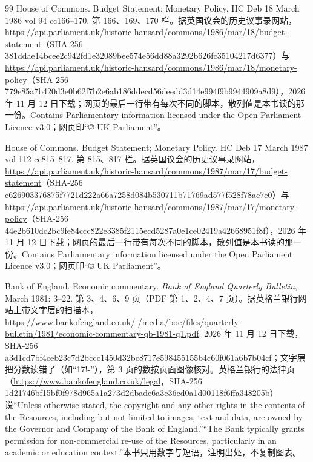 \begin{thebibliography}{99}
 House of Commons. Budget Statement; Monetary Policy. HC Deb 18 March 1986 vol 94 cc166--170. 第 166、169、170 栏。据英国议会的历史议事录网站，\url{https://api.parliament.uk/historic-hansard/commons/1986/mar/18/budget-statement}（SHA-256 381ddae14bcee2c942fd1e32089bee574e56dd88a3292b626fc35104217d6377）与 \url{https://api.parliament.uk/historic-hansard/commons/1986/mar/18/monetary-policy}（SHA-256 779e85a7b420d3e0b62f7b2e6ab186ddecd56deedd3d14e994f9b9944909a8d9），2026 年 11 月 12 日下载；网页的最后一行带有每次不同的脚本，散列值是本书读的那一份。Contains Parliamentary information licensed under the Open Parliament Licence v3.0；网页印“© UK Parliament”。

 House of Commons. Budget Statement; Monetary Policy. HC Deb 17 March 1987 vol 112 cc815--817. 第 815、817 栏。据英国议会的历史议事录网站，\url{https://api.parliament.uk/historic-hansard/commons/1987/mar/17/budget-statement}（SHA-256 c626903376875f7721d222a66a7258d084b530711b71769ad577f528f78ac7e0）与 \url{https://api.parliament.uk/historic-hansard/commons/1987/mar/17/monetary-policy}（SHA-256 44e2b610dc2bc9fe84ccc822e3385f2115ecd5287a0e1ce02419a42668951f8f），2026 年 11 月 12 日下载；网页的最后一行带有每次不同的脚本，散列值是本书读的那一份。Contains Parliamentary information licensed under the Open Parliament Licence v3.0；网页印“© UK Parliament”。

 Bank of England. Economic commentary. \emph{Bank of England Quarterly Bulletin}, March 1981: 3--22. 第 3、4、6、9 页（PDF 第 1、2、4、7 页）。据英格兰银行网站上带文字层的扫描本，\url{https://www.bankofengland.co.uk/-/media/boe/files/quarterly-bulletin/1981/economic-commentary-qb-1981-q1.pdf}. 2026 年 11 月 12 日下载，SHA-256 a3d1cd7bf4ceb23c7d2bccc1450d32bc8717e598455155b4c60f061a6b7b04cf；文字层把分数读错了（如“17!-”），第 3 页的数按页面图像核对。英格兰银行的法律页（\url{https://www.bankofengland.co.uk/legal}，SHA-256 1d21746bf15bf0f978d965a1a273d2dbade6a3c36cd0a1d00118f6ffa348205b）说“Unless otherwise stated, the copyright and any other rights in the contents of the Resources, including but not limited to images, text and data, are owned by the Governor and Company of the Bank of England.”“The Bank typically grants permission for non-commercial re-use of the Resources, particularly in an academic or education context.”本书只用数字与短语，注明出处，不复制图表。


\end{thebibliography}
